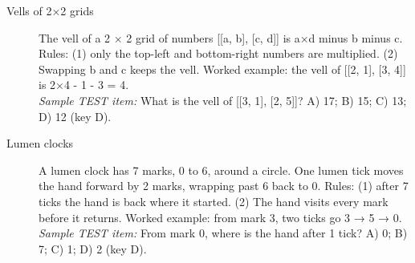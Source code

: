 \begin{description}
\item[Vells of 2×2 grids] The vell of a 2 × 2 grid of numbers [[a, b], [c, d]] is a×d minus b minus c. Rules: (1) only the top-left and bottom-right numbers are multiplied. (2) Swapping b and c keeps the vell. Worked example: the vell of [[2, 1], [3, 4]] is 2×4 - 1 - 3 = 4.\\ \emph{Sample TEST item:} What is the vell of [[3, 1], [2, 5]]? A) 17; B) 15; C) 13; D) 12 (key D).
\item[Lumen clocks] A lumen clock has 7 marks, 0 to 6, around a circle. One lumen tick moves the hand forward by 2 marks, wrapping past 6 back to 0. Rules: (1) after 7 ticks the hand is back where it started. (2) The hand visits every mark before it returns. Worked example: from mark 3, two ticks go 3 → 5 → 0.\\ \emph{Sample TEST item:} From mark 0, where is the hand after 1 tick? A) 0; B) 7; C) 1; D) 2 (key D).
\end{description}
